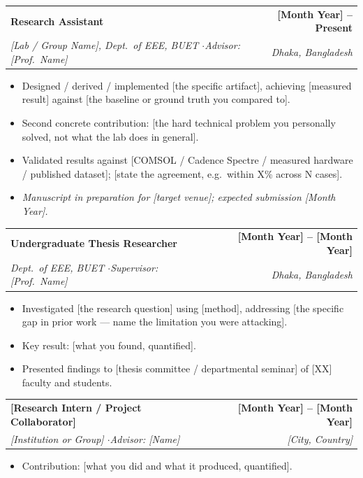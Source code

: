 \documentclass[11pt,letterpaper]{article}   %
\makeatletter
\newcommand{\entry}[4]{%
  \vspace{3pt}%
  \noindent\begin{tabularx}{\textwidth}{@{}X r@{}}
    \textbf{#1} & \textbf{#2}\\
    \textit{\textcolor{subtle}{#3}} & \textit{\textcolor{subtle}{#4}}\\
  \end{tabularx}%
  \vspace{-4pt}%
}
\makeatother
\begin{document}
\entry{Research Assistant}{[Month Year] -- Present}
      {[Lab / Group Name], Dept.\ of EEE, BUET \quad$\cdot$\quad Advisor: [Prof.\ Name]}{Dhaka, Bangladesh}
\begin{itemize}
  \item Designed / derived / implemented [the specific artifact], achieving [measured
        result] against [the baseline or ground truth you compared to].
  \item Second concrete contribution: [the hard technical problem you personally solved,
        not what the lab does in general].
  \item Validated results against [COMSOL / Cadence Spectre / measured hardware /
        published dataset]; [state the agreement, e.g.\ within X\% across N cases].
  \item \textit{Manuscript in preparation for [target venue]; expected submission [Month Year].}
\end{itemize}

\entry{Undergraduate Thesis Researcher}{[Month Year] -- [Month Year]}
      {Dept.\ of EEE, BUET \quad$\cdot$\quad Supervisor: [Prof.\ Name]}{Dhaka, Bangladesh}
\begin{itemize}
  \item Investigated [the research question] using [method], addressing [the specific
        gap in prior work — name the limitation you were attacking].
  \item Key result: [what you found, quantified].
  \item Presented findings to [thesis committee / departmental seminar] of [XX] faculty and students.
\end{itemize}

\entry{[Research Intern / Project Collaborator]}{[Month Year] -- [Month Year]}
      {[Institution or Group] \quad$\cdot$\quad Advisor: [Name]}{[City, Country]}
\begin{itemize}
  \item Contribution: [what you did and what it produced, quantified].
\end{itemize}

%
%
\end{document}
